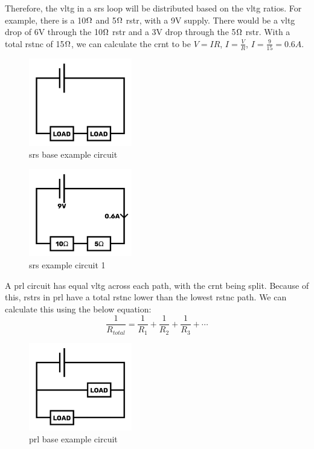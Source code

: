 \documentclass[a4paper,11pt]{report}
\begin{document}
Therefore, the \gls{vltg} in a \gls{srs} loop will be distributed based on the \gls{vltg} ratios. For example, there is a 10$\ohm$ and 5$\ohm$ \gls{rstr}, with a 9V supply. There would be a \gls{vltg} drop of 6V through the 10$\ohm$ \gls{rstr} and a 3V drop through the 5$\ohm$ \gls{rstr}. With a total \gls{rstnc} of 15$\ohm$, we can calculate the \gls{crnt} to be $V=IR$, $I=\frac{V}{R}$, $I=\frac{9}{15}=0.6A$.

\begin{figure}[H]
\centering
\includegraphics[width=0.4\textwidth]{series1}
\caption{\gls{srs} base example circuit}
\end{figure}

\begin{figure}[H]
\centering
\includegraphics[width=0.4\textwidth]{series2}
\caption{\gls{srs} example circuit 1}
\end{figure}

A \gls{prl} circuit has equal \gls{vltg} across each path, with the \gls{crnt} being split. Because of this, \gls{rstr}s in \gls{prl} have a total \gls{rstnc} lower than the lowest \gls{rstnc} path.
We can calculate this using the below equation:
\[\frac{1}{R_{total}} = \frac{1}{R_1} + \frac{1}{R_2} + \frac{1}{R_3} + \cdots\]

\begin{figure}[H]
\centering
\includegraphics[width=0.4\textwidth]{parallel1}
\caption{\gls{prl} base example circuit}
\end{figure}
\end{document}
